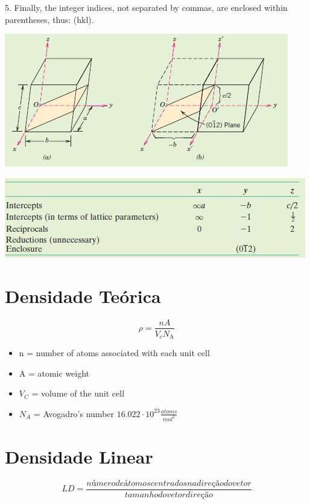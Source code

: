 5. Finally, the integer indices, not separated by commas, are enclosed within
parentheses, thus: (hkl).


\includegraphics[scale=0.27,trim={0 0 0 0}]{figures/planSum1}

\includegraphics[scale=0.27,trim={0 0 0 0}]{figures/planSum2}


\section{Densidade Teórica}

\begin{equation}\label{key}
\rho=\frac{n A}{V_{c} N_{\mathrm{A}}}
\end{equation}

\begin{itemize}
	\item n = number of atoms associated with each unit cell
	\item A = atomic weight
	\item $V_{C}$ = volume of the unit cell
	\item $N_{A}$ = Avogadro’s number $16.022 \cdot 10^{23} \frac{atoms}{mol^{2}}$
\end{itemize}


\section{Densidade Linear}

\begin{equation}\label{key}
LD = \frac{número de átomos centrados na direção do vetor}{tamanho do vetor direção}
\end{equation}



